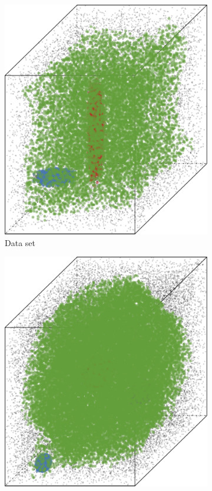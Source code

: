\begin{figure}
\begin{subfigure}{0.23\textwidth}
				\includegraphics[keepaspectratio=true, width=\textwidth, height=0.23\textheight]{discussion/img/baakman_2_abs_error_mbeSmallerThansambe}
				\caption{Data set \baakmanTwo}
				\label{fig:discussion:performance:mbeLowerError:baakman2}
			\end{subfigure}	
			\subfigvspace
			\begin{subfigure}{0.23\textwidth}
				\centering
				\includegraphics[keepaspectratio=true, width=\textwidth, height=0.23\textheight]{discussion/img/ferdosi_3_abs_error_mbeSmallerThansambe}

\end{subfigure}
\end{figure}
